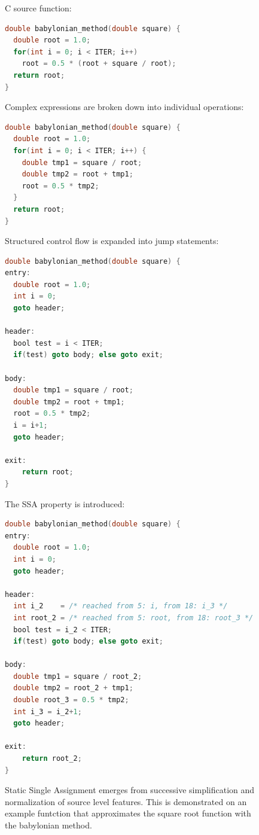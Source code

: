 \begin{figure}[p]
\scriptsize
    C source function:
    \begin{lstlisting}[language=C]
double babylonian_method(double square) {
  double root = 1.0;
  for(int i = 0; i < ITER; i++)
    root = 0.5 * (root + square / root);
  return root;
}
    \end{lstlisting}

    Complex expressions are broken down into individual operations:
    \begin{lstlisting}[language=C]
double babylonian_method(double square) {
  double root = 1.0;
  for(int i = 0; i < ITER; i++) {
    double tmp1 = square / root;
    double tmp2 = root + tmp1;
    root = 0.5 * tmp2;
  }
  return root;
}
    \end{lstlisting}

    Structured control flow is expanded into jump statements:
    \begin{lstlisting}[language=C]
double babylonian_method(double square) {
entry:
  double root = 1.0;
  int i = 0;
  goto header;

header:
  bool test = i < ITER;
  if(test) goto body; else goto exit;

body:
  double tmp1 = square / root;
  double tmp2 = root + tmp1;
  root = 0.5 * tmp2;
  i = i+1;
  goto header;

exit:
    return root;
}
    \end{lstlisting}

    The SSA property is introduced:
    \begin{lstlisting}[language=C]
double babylonian_method(double square) {
entry:
  double root = 1.0;
  int i = 0;
  goto header;

header:
  int i_2    = /* reached from 5: i, from 18: i_3 */
  int root_2 = /* reached from 5: root, from 18: root_3 */
  bool test = i_2 < ITER;
  if(test) goto body; else goto exit;

body:
  double tmp1 = square / root_2;
  double tmp2 = root_2 + tmp1;
  double root_3 = 0.5 * tmp2;
  int i_3 = i_2+1;
  goto header;

exit:
    return root_2;
}
    \end{lstlisting}

    \caption{Static Single Assignment emerges from successive simplification
             and normalization of source level features.
             This is demonstrated on an example funtction that approximates the
             square root function with the babylonian method.}
    \label{ssaexample}
\end{figure}

